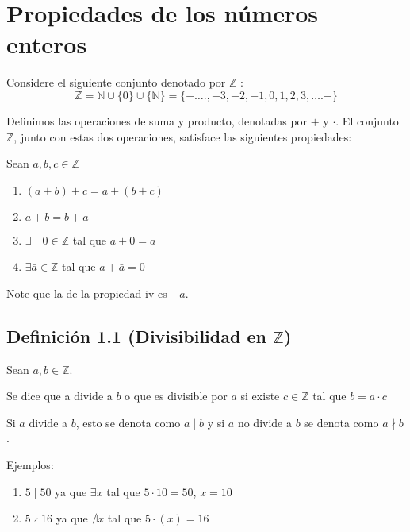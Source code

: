 \documentclass{article}
\begin{document}
\newpage
\section{Propiedades de los números enteros}
 
    Considere el siguiente conjunto denotado por $\mathbb{Z}$ :
    $$
    \mathbb{Z}=\mathbb{N} \cup\{0\} \cup\{\mathbb{N}\}=\{-\ldots .,-3,-2,-1,0,1,2,3, \ldots .+\}
    $$

     Definimos las operaciones de suma y producto, denotadas por \(+\) y \(\cdot\).  El conjunto \(\mathbb{Z}\), junto con estas dos operaciones, satisface las siguientes propiedades:

    Sean $a, b, c \in \mathbb{Z}$
    \begin{enumerate}[label=\roman*)]
    \item $(a+b)+c=a+(b+c)$
    
    \item $a+b=b+a$
    
    \item $\exists \quad 0 \in \mathbb{Z}$ tal que $a+0=a$
    
    \item $\exists \bar{a} \in \mathbb{Z}$ tal que $a+\bar{a}=0$
    \end{enumerate}
        
    Note que la de la propiedad \(\text{iv}\) es \(-a\).
\newpage

    \subsection*{Definición 1.1 (Divisibilidad en \(\mathbb{Z}\))}


        Sean $a, b \in \mathbb{Z}$. 
        
        Se dice que a divide a $b$ o que es  divisible por $a$ si existe $c \in \mathbb{Z}$ tal que $b=a\cdot  c$

        Si $a$ divide a $b$, esto se denota como $a\mid b$ y si $a$ no divide a $b$ se denota como $a\nmid b$.
        
        
        Ejemplos:
        \begin{enumerate}[label=\roman*)]
            \item $5\mid 50$ ya que $\exists x$ tal que $5\cdot 10=50$, $x=10$
            \item $5\nmid 16$ ya que $\nexists x$ tal que $5\cdot (x)=16$
        \end{enumerate}
\end{document}
